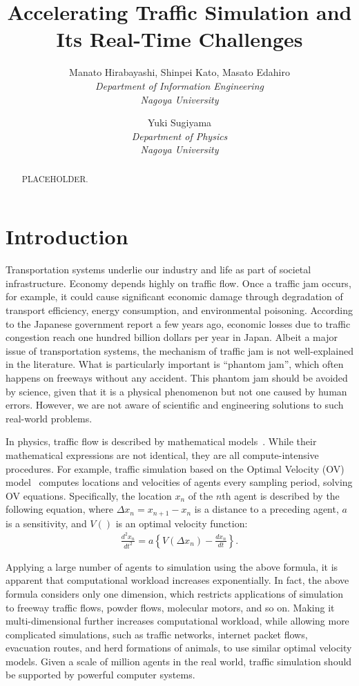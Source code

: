 \documentclass[times, 10pt, twocolumn]{article}
\title{Accelerating Traffic Simulation and Its Real-Time Challenges}
\author {
Manato Hirabayashi, Shinpei Kato, Masato Edahiro\\
\textit{Department of Information Engineering}\\
\textit{Nagoya University}\\
\and
Yuki Sugiyama\\
\textit{Department of Physics}\\
\textit{Nagoya University}\\
}
\begin{document}
\maketitle


\begin{abstract}
PLACEHOLDER.
\end{abstract}

\section{Introduction}

Transportation systems underlie our industry and life as part of
societal infrastructure.
Economy depends highly on traffic flow.
Once a traffic jam occurs, for example, it could cause significant
economic damage through degradation of transport efficiency, energy
consumption, and environmental poisoning.
According to the Japanese government report a few years ago, economic
losses due to traffic congestion reach one hundred billion dollars per
year in Japan.
Albeit a major issue of transportation systems, the mechanism of traffic
jam is not well-explained in the literature.
What is particularly important is ``phantom jam'', which often happens
on freeways without any accident.
This phantom jam should be avoided by science, given that it is
a physical phenomenon but not one caused by human errors.
However, we are not aware of scientific and engineering solutions to
such real-world problems.

In physics, traffic flow is described by mathematical
models~\cite{Bando1995, Kerner1993, Nagel1992}.
While their mathematical expressions are not identical, they are all
compute-intensive procedures.
For example, traffic simulation based on the Optimal Velocity (OV)
model~\cite{Bando1995} computes locations and velocities of agents every
sampling period, solving OV equations. 
Specifically, the location $x_n$ of the $n$th agent is described by the
following equation, where $\Delta x_n = x_{n+1} - x_n$ is a distance to
a preceding agent, $a$ is a sensitivity, and $V()$ is an optimal
velocity function:
\begin{eqnarray}
 \label{eqn:ov}
 \frac{d^2 x_n}{d t^2} = a \left\{V(\Delta x_n) - \frac{d x_n}{d t}\right\}.
\end{eqnarray}

Applying a large number of agents to simulation using the above formula,
it is apparent that computational workload increases exponentially.
In fact, the above formula considers only one dimension, which restricts
applications of simulation to freeway traffic flows, powder flows,
molecular motors, and so on.
Making it multi-dimensional further increases computational workload,
while allowing more complicated simulations, such as traffic networks,
internet packet flows, evacuation routes, and herd formations of
animals, to use similar optimal velocity models.
Given a scale of million agents in the real world, traffic
simulation should be supported by powerful computer systems.
\end{document}
